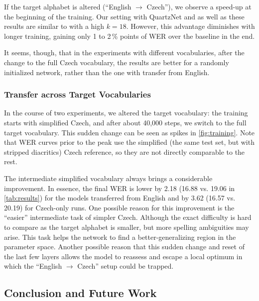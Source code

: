 If the target alphabet is altered (``English $\rightarrow$ Czech''), we observe a speed-up at the beginning of the training. Our setting with QuartzNet and as well as these results are similar to  with a high $k = 18$. %
However, this advantage diminishes with longer training, gaining only
1 to 2\,\% points of WER over the baseline in the end.

It seems, though, that in the experiments with different vocabularies, after the change to the full Czech vocabulary, the results are better for a randomly initialized network, rather than the one with transfer from English.

\subsubsection{Transfer across Target Vocabularies}

In the course of two experiments, we altered the target vocabulary: the training starts with simplified Czech, and after about 40,000 steps, we switch to the full target vocabulary. This sudden change can be seen as spikes in \cref{fig:training}. Note that WER curves prior to the peak use the simplified (the same test set, but with stripped diacritics) Czech reference, so they are not directly comparable to the rest.

The intermediate simplified vocabulary always brings a considerable improvement. In essence, the final WER is lower by 2.18 (16.88 vs. 19.06 in \cref{tab:results}) for the models transferred from English and by 3.62 (16.57 vs. 20.19) for Czech-only runs.
One possible reason for this improvement is the ``easier'' intermediate task of simpler Czech. Although the exact difficulty is hard to compare as the target alphabet is smaller, but more spelling ambiguities may arise. This task helps the network to find a better-generalizing region in the parameter space. Another possible reason that this sudden change and reset of the last few layers allows the model to reassess and escape a local optimum in which the ``English $\rightarrow$ Czech'' setup could be trapped.


\subsection{Conclusion and Future Work}
\label{sec:conclusion}

